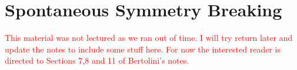 \chapter{Spontaneous Symmetry Breaking}

\textcolor{red}{This material was not lectured as we ran out of time. I will try return later and update the notes to include some stuff here. For now the interested reader is directed to Sections 7,8 and 11 of Bertolini's notes.}